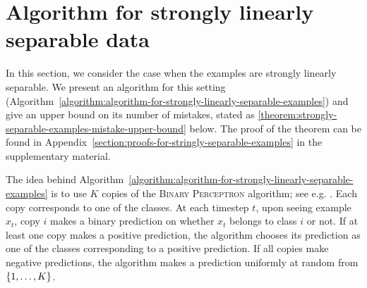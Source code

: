 \section{Algorithm for strongly linearly separable data}
\label{section:algorithm-for-strongly-linearly-separable-data}

In this section, we consider the case when the examples are strongly linearly
separable. We present an algorithm for this setting
(Algorithm~\ref{algorithm:algorithm-for-strongly-linearly-separable-examples})
and give an upper bound on its number of mistakes, stated as
\autoref{theorem:strongly-separable-examples-mistake-upper-bound} below. The
proof of the theorem can be found in
Appendix~\ref{section:proofs-for-stringly-separable-examples} in the
supplementary material.

The idea behind
Algorithm~\ref{algorithm:algorithm-for-strongly-linearly-separable-examples} is
to use $K$ copies of the \textsc{Binary Perceptron} algorithm; see e.g.
\citet[Section 3.3.1]{Shalev-Shwartz-2012}. Each copy corresponds to one of the
classes. At each timestep $t$, upon seeing example $x_t$, copy $i$ makes a
binary prediction on whether $x_t$ belongs to class $i$ or not. If at least one
copy makes a positive prediction, the algorithm chooses its prediction as one of
the classes corresponding to a positive prediction. If all copies make negative
predictions, the algorithm makes a prediction uniformly at random from
$\cbr{1,\ldots,K}$.



